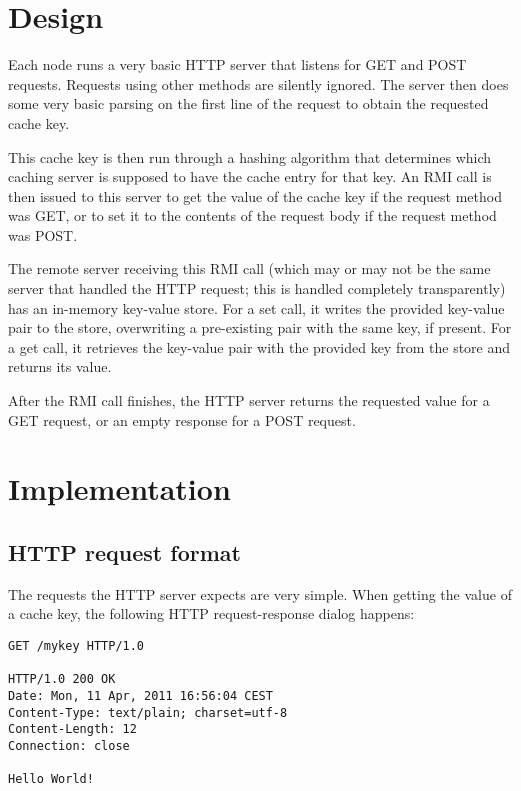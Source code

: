 \documentclass{article}
\begin{document}
\section*{Design}
Each node runs a very basic HTTP server that listens for GET and POST requests. Requests using
other methods are silently ignored. The server then does some very basic parsing on the first line
of the request to obtain the requested cache key.

This cache key is then run through a hashing algorithm that determines which caching server is
supposed to have the cache entry for that key. An RMI call is then issued to this server to
get the value of the cache key if the request method was GET, or to set it to the contents
of the request body if the request method was POST.

The remote server receiving this RMI call (which may or may not be the same server that
handled the HTTP request; this is handled completely transparently) has an in-memory
key-value store. For a set call, it writes the provided key-value pair to the store,
overwriting a pre-existing pair with the same key, if present. For a get call, it
retrieves the key-value pair with the provided key from the store and returns its
value.

After the RMI call finishes, the HTTP server returns the requested value for a GET
request, or an empty response for a POST request.

\section*{Implementation}
\subsection*{HTTP request format}
The requests the HTTP server expects are very simple. When getting the value of a
cache key, the following HTTP request-response dialog happens:

\begin{lstlisting}
GET /mykey HTTP/1.0

HTTP/1.0 200 OK 
Date: Mon, 11 Apr, 2011 16:56:04 CEST
Content-Type: text/plain; charset=utf-8
Content-Length: 12
Connection: close

Hello World!
\end{lstlisting}
\end{document}
